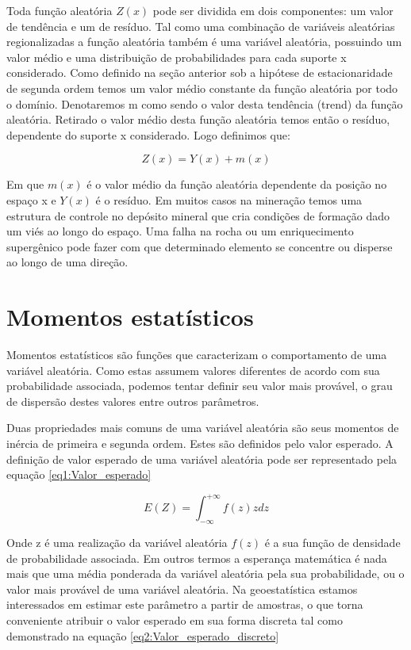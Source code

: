 Toda função aleatória $Z(x)$ pode ser dividida em dois componentes:  um valor de tendência e um de resíduo. Tal como uma combinação de variáveis aleatórias regionalizadas a função aleatória também é uma variável aleatória, possuindo um valor médio e uma distribuição de probabilidades para cada suporte x considerado. Como definido na seção anterior sob a hipótese de estacionaridade de segunda ordem temos um valor médio constante da função aleatória por todo o domínio. Denotaremos m como sendo o valor desta tendência (trend) da função aleatória. Retirado o valor médio desta função aleatória temos então o resíduo, dependente do suporte x considerado. Logo definimos que:

\begin{equation}\label{eq0:Decomposicaovariavel}
Z(x) = Y(x) + m(x)
\end{equation}

Em que $m(x)$ é o valor médio da função aleatória dependente da posição no espaço x e $Y(x)$ é o resíduo. Em muitos casos na mineração temos uma estrutura de controle no depósito mineral que cria condições de formação dado um viés ao longo do espaço. Uma falha na rocha ou um enriquecimento supergênico pode fazer com que determinado elemento se concentre ou disperse ao longo de uma direção. 

\section{Momentos estatísticos}


Momentos estatísticos são funções que caracterizam o comportamento de uma variável aleatória. Como estas assumem valores diferentes de acordo com sua probabilidade associada, podemos tentar definir seu valor mais provável, o grau de dispersão destes valores entre outros parâmetros. 

Duas propriedades mais comuns de uma variável aleatória são seus momentos de inércia de primeira e segunda ordem. Estes são definidos pelo valor esperado. A definição de valor esperado de uma variável aleatória pode ser representado pela equação \eqref{eq1:Valor_esperado} 

\begin{equation}\label{eq1:Valor_esperado}
E\left(Z\right)= \int_{-\infty}^{+\infty} f\left(z\right)zdz
\end{equation}

Onde z é uma realização da variável aleatória $f(z)$ é a sua função de densidade de probabilidade associada. Em outros termos a esperança matemática é nada mais que uma média ponderada da variável aleatória pela sua probabilidade, ou o valor mais provável de uma variável aleatória. Na geoestatística estamos interessados em estimar este parâmetro a partir de amostras, o que torna conveniente atribuir o valor esperado em sua forma discreta tal como demonstrado na equação \eqref{eq2:Valor_esperado_discreto}

